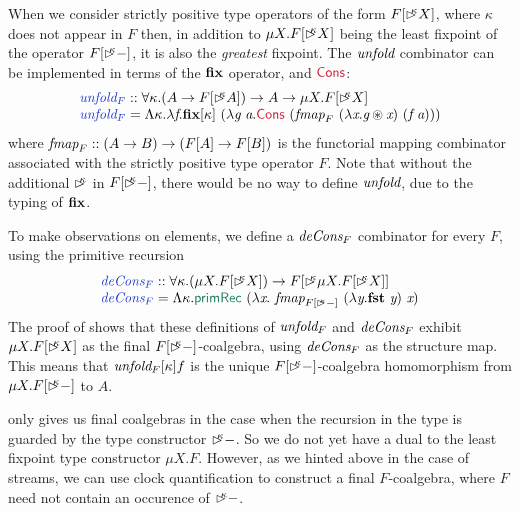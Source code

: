 When we consider strictly positive type operators of the form
$F[\mathord{\rhd\kern-0.4em^{\kappa}} X]$, where $\kappa$ does not appear in $F$ then, in
addition to $\mu X. F[\mathord{\rhd\kern-0.4em^{\kappa}} X]$ being the least fixpoint of the
operator $F[\mathord{\rhd\kern-0.4em^{\kappa}} -]$, it is also the \emph{greatest}
fixpoint. The $\textit{unfold}$ combinator can be implemented in terms
of the $\textbf{fix}$ operator, and $\cons{Cons}$:
\begin{displaymath}
  \begin{array}[t]{l}
    \defn{unfold$_F$} :: \forall \kappa. (A \to F[\delay\kappa A]) \to A \to \mu X. F[\delay\kappa X] \\
    \defn{unfold$_F$} = \Lambda \kappa.\lambda \ident{f}. \kw{fix}[\kappa]\ (\lambda \ident{g}\ \ident{a}. \cons{Cons}\ (\ident{fmap}_F\ (\lambda \ident{x}. \ident{g} \circledast \ident{x})\ (\ident{f}\ \ident{a})))
  \end{array}
\end{displaymath}
where $\textit{fmap}_F :: (A \to B) \to (F[A] \to F[B])$ is the
functorial mapping combinator associated with the strictly positive
type operator $F$. Note that without the additional $\mathord{\rhd\kern-0.4em^{\kappa}}$ in
$F[\mathord{\rhd\kern-0.4em^{\kappa}} -]$, there would be no way to define $\textit{unfold}$,
due to the typing of $\textbf{fix}$.

To make observations on elements, we define a $\textit{deCons$_F$}$
combinator for every $F$, using the primitive recursion
\begin{displaymath}
  \begin{array}{l}
    \defn{deCons$_F$} :: \forall \kappa. (\mu X. F[\delay\kappa X]) \to F[\delay\kappa \mu X. F[\delay\kappa X]] \\
    \defn{deCons$_F$} = \Lambda \kappa. \elim{primRec}\ (\lambda \ident{x}.\ \ident{fmap}_{F[\delay\kappa-]}\ (\lambda \ident{y}.\kw{fst}\ \ident{y})\ \ident{x})
  \end{array}
\end{displaymath}
The proof of  shows that these
definitions of $\textit{unfold$_F$}$ and $\textit{deCons$_F$}$ exhibit
$\mu X. F[\mathord{\rhd\kern-0.4em^{\kappa}} X]$ as the final $F[\mathord{\rhd\kern-0.4em^{\kappa}}-]$-coalgebra,
using $\textit{deCons$_F$}$ as the structure map. This means that
$\textit{unfold$_F$}[\kappa] f$ is the unique $F[\mathord{\rhd\kern-0.4em^{\kappa}}-]$-coalgebra
homomorphism from $\mu X. F[\mathord{\rhd\kern-0.4em^{\kappa}}-]$ to $A$.

 only gives us final coalgebras in
the case when the recursion in the type is guarded by the type
constructor $\mathord{\rhd\kern-0.4em^{\kappa}}-$. So we do not yet have a dual to the least
fixpoint type constructor $\mu X. F$. However, as we hinted above in
the case of streams, we can use clock quantification to construct a
final $F$-coalgebra, where $F$ need not contain an occurence of
$\mathord{\rhd\kern-0.4em^{\kappa}}-$.

